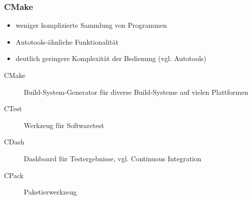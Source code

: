 \begin{frame}
	\frametitle{CMake}
	\begin{itemize}
		\pause
		\item weniger komplizierte Sammlung von Programmen
		\pause
		\item Autotools-ähnliche Funktionalität
		\pause
		\item deutlich geringere Komplexität der Bedienung (vgl. Autotools)
%
	\end{itemize}
	\begin{description}
		\item[CMake] Build-System-Generator für diverse Build-Systeme auf vielen Plattformen
		\item[CTest] Werkzeug für Softwaretest
		\item[CDash] Dashboard für Testergebnisse, vgl. Continuous Integration
		\item[CPack] Paketierwerkzeug
	\end{description}
\end{frame}
